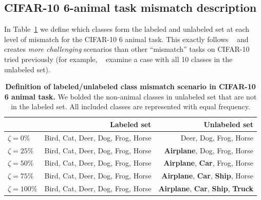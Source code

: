 \subsection{CIFAR-10 6-animal task mismatch description}

In Table~\ref{tab:CIFAR10_Class_MisMatch_Description} we define which classes form the labeled and unlabeled set at each level of mismatch for the CIFAR-10 6 animal task. This exactly follows ~\citet{oliverRealisticEvaluationDeep2018} and creates \emph{more challenging} scenarios than other ``mismatch'' tasks on CIFAR-10 tried previously (for example, ~\citep{saitoOpenMatchOpensetConsistency2021} examine a case with all 10 classes in the unlabeled set).

\setlength{\tabcolsep}{.8cm}
\begin{table}[!h]
\centering
\begin{tabular}{l | r | r  }
& Labeled set & Unlabeled set
\\ \hline
$\zeta=0\%$ & {Bird, Cat, Deer, Dog, Frog, Horse} & {Deer, Dog, Frog, Horse}
\\
$\zeta=25\%$ & {Bird, Cat, Deer, Dog, Frog, Horse} & {\textbf{Airplane}, Dog, Frog, Horse}
\\
$\zeta=50\%$ & {Bird, Cat, Deer, Dog, Frog, Horse} & {\textbf{Airplane}, \textbf{Car}, Frog, Horse}
\\
$\zeta=75\%$ & {Bird, Cat, Deer, Dog, Frog, Horse} & {\textbf{Airplane}, \textbf{Car}, \textbf{Ship}, Horse}
\\
$\zeta=100\%$ & {Bird, Cat, Deer, Dog, Frog, Horse} & {\textbf{Airplane}, \textbf{Car}, \textbf{Ship}, \textbf{Truck}}
\\

\end{tabular}
    \caption{
    \textbf{Definition of labeled/unlabeled class mismatch scenario in CIFAR-10 6 animal task.} We bolded the non-animal classes in unlabeled set that are not in the labeled set.
    All included classes are represented with equal frequency.
    }%
    \label{tab:CIFAR10_Class_MisMatch_Description}
\end{table}



